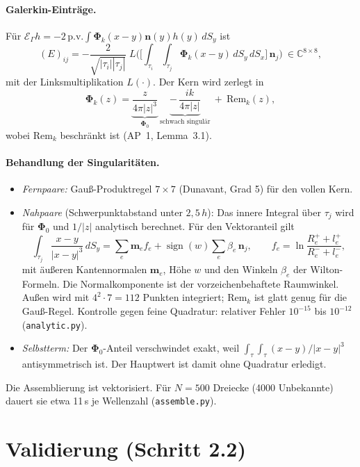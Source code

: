 \documentclass[11pt, a4paper]{article}
\newcommand{\mvec}[1]{\boldsymbol{#1}}
\newcommand{\n}{\mvec{n}}
\newcommand{\EG}{\mathcal{E}_\Gamma}
\begin{document}
\paragraph{Galerkin-Einträge.} Für $\EG h=-2\,\mathrm{p.v.}\!\int\mvec\Phi_k(x-y)\n(y)h(y)\,dS_y$ ist
\[
  (E)_{ij} = -\frac{2}{\sqrt{|\tau_i||\tau_j|}}\;L\Big(\Big[\int_{\tau_i}\!\int_{\tau_j}\mvec\Phi_k(x-y)\,dS_y\,dS_x\Big]\,\n_j\Big)\ \in\mathbb{C}^{8\times8},
\]
mit der Linksmultiplikation $L(\cdot)$. Der Kern wird zerlegt in
\[
  \mvec\Phi_k(z) = \underbrace{\frac{z}{4\pi|z|^3}}_{\mvec\Phi_0}\ \underbrace{-\,\frac{ik}{4\pi|z|}}_{\text{schwach singulär}}\ +\ \mathrm{Rem}_k(z),
\]
wobei $\mathrm{Rem}_k$ beschränkt ist (AP~1, Lemma~3.1).

\paragraph{Behandlung der Singularitäten.}
\begin{itemize}[leftmargin=*]
  \item \emph{Fernpaare:} Gauß-Produktregel $7\times7$ (Dunavant, Grad 5) für den
    vollen Kern.
  \item \emph{Nahpaare} (Schwerpunktabstand unter $2{,}5\,h$): Das innere Integral über
    $\tau_j$ wird für $\mvec\Phi_0$ und $1/|z|$ analytisch berechnet. Für den
    Vektoranteil gilt
    \[
      \int_{\tau_j}\frac{x-y}{|x-y|^3}\,dS_y = \sum_{e}\mvec{m}_e f_e + \operatorname{sign}(w)\sum_e\beta_e\,\n_j,
      \qquad f_e=\ln\frac{R_e^++l_e^+}{R_e^-+l_e^-},
    \]
    mit äußeren Kantennormalen $\mvec{m}_e$, Höhe $w$ und den Winkeln $\beta_e$ der
    Wilton-Formeln. Die Normalkomponente ist der vorzeichenbehaftete Raumwinkel.
    Außen wird mit $4^2\cdot7=112$ Punkten integriert; $\mathrm{Rem}_k$ ist glatt genug für
    die Gauß-Regel. Kontrolle gegen feine Quadratur: relativer Fehler
    $10^{-15}$ bis $10^{-12}$ (\texttt{analytic.py}).
  \item \emph{Selbstterm:} Der $\mvec\Phi_0$-Anteil verschwindet exakt, weil
    $\int_\tau\int_\tau (x-y)/|x-y|^3$ antisymmetrisch ist. Der Hauptwert ist damit ohne
    Quadratur erledigt.
\end{itemize}
Die Assemblierung ist vektorisiert. Für $N=500$ Dreiecke (4000 Unbekannte) dauert sie
etwa 11\,s je Wellenzahl (\texttt{assemble.py}).

\section{Validierung (Schritt 2.2)}
\end{document}
